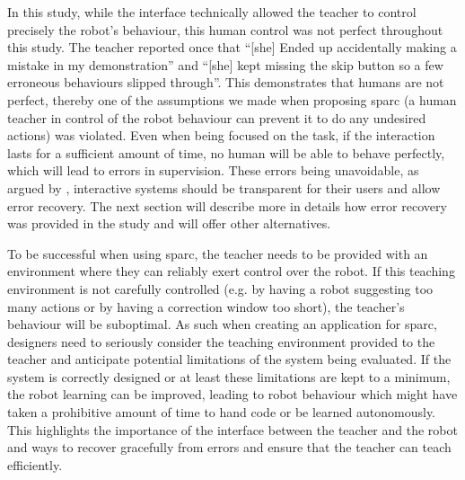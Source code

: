 In this study, while the interface technically allowed the teacher to control precisely the robot's behaviour, this human control was not perfect throughout this study. %
The teacher reported once that ``[she] Ended up accidentally making a mistake in my demonstration'' and ``[she] kept missing the skip button so a few erroneous behaviours slipped through''. This demonstrates that humans are not perfect, thereby one of the assumptions we made when proposing \gls{sparc} (a human teacher in control of the robot behaviour can prevent it to do any undesired actions) was violated. Even when being focused on the task, if the interaction lasts for a sufficient amount of time, no human will be able to behave perfectly, which will lead to errors in supervision. These errors being unavoidable, as argued by \cite{rasmussen1989coping}, interactive systems should be transparent for their users and allow error recovery. The next section will describe more in details how error recovery was provided in the study and will offer other alternatives.


To be successful when using \gls{sparc}, the teacher needs to be provided with an environment where they can reliably exert control over the robot. If this teaching environment is not carefully controlled (e.g. by having a robot suggesting too many actions or by having a correction window too short), the teacher's behaviour will be suboptimal. As such when creating an application for \gls{sparc}, designers need to seriously consider the teaching environment provided to the teacher and anticipate potential limitations of the system being evaluated. If the system is correctly designed or at least these limitations are kept to a minimum, the robot learning can be improved, leading to robot behaviour which might have taken a prohibitive amount of time to hand code or be learned autonomously. This highlights the importance of the interface between the teacher and the robot and ways to recover gracefully from errors and ensure that the teacher can teach efficiently. 

